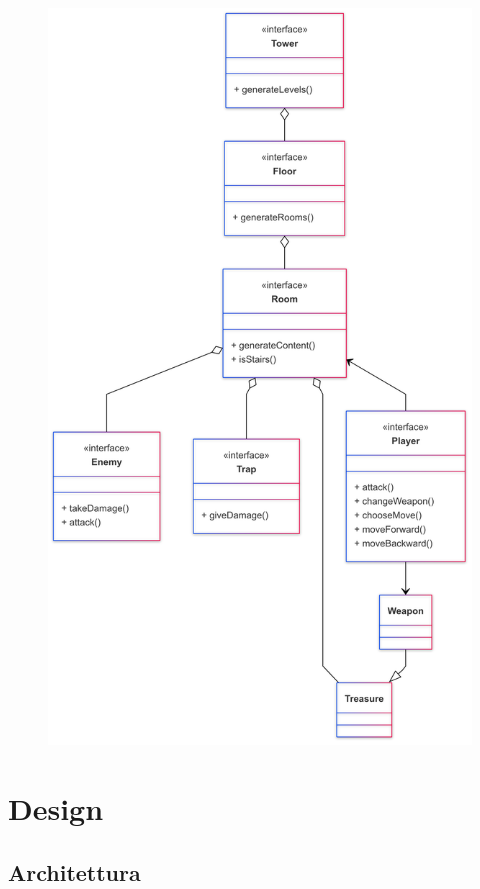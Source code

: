 \documentclass[a4paper,12pt]{report}
\begin{document}
\begin{figure}[H]
	\includegraphics[scale=0.15]{img/design.png}
\end{figure}

\chapter{Design}

\section{Architettura}
\end{document}
